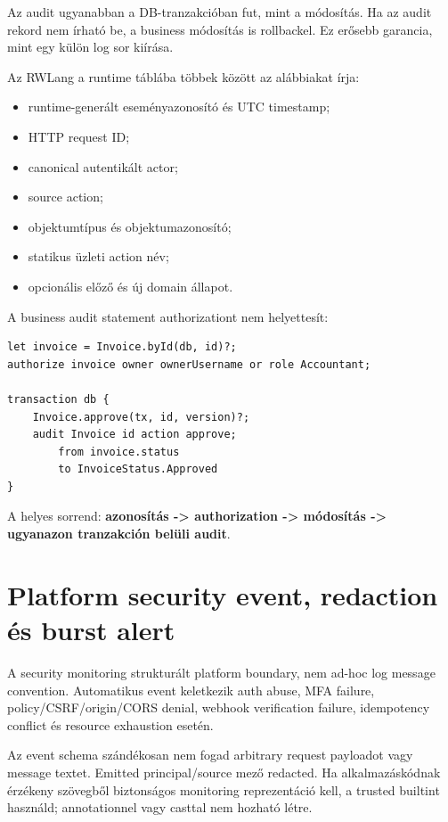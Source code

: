 Az audit ugyanabban a DB-tranzakcióban fut, mint a módosítás. Ha az audit rekord nem írható be, a business módosítás is rollbackel. Ez erősebb garancia, mint egy külön log sor kiírása.

Az RWLang a  runtime táblába többek között az alábbiakat írja:

\begin{itemize}
  \item runtime-generált eseményazonosító és UTC timestamp;
  \item HTTP request ID;
  \item canonical autentikált actor;
  \item source action;
  \item objektumtípus és objektumazonosító;
  \item statikus üzleti action név;
  \item opcionális előző és új domain állapot.
\end{itemize}

\Needspace{0.30\textheight}
A business audit statement authorizationt nem helyettesít:

\begin{lstlisting}[language=RWLang]
let invoice = Invoice.byId(db, id)?;
authorize invoice owner ownerUsername or role Accountant;

transaction db {
    Invoice.approve(tx, id, version)?;
    audit Invoice id action approve;
        from invoice.status
        to InvoiceStatus.Approved
}
\end{lstlisting}

A helyes sorrend: \textbf{azonosítás -> authorization -> módosítás -> ugyanazon tranzakción belüli audit}.

\section{Platform security event, redaction és burst alert}

A security monitoring strukturált platform boundary, nem ad-hoc log message convention. Automatikus event keletkezik auth abuse, MFA failure, policy/CSRF/origin/CORS denial, webhook verification failure, idempotency conflict és resource exhaustion esetén.

Az event schema szándékosan nem fogad arbitrary request payloadot vagy message textet. Emitted principal/source mező redacted. Ha alkalmazáskódnak érzékeny szövegből biztonságos monitoring reprezentáció kell, a trusted  builtint használd;  annotationnel vagy casttal nem hozható létre.

